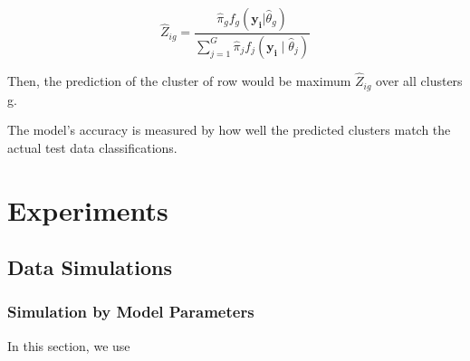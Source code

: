 \documentclass{article}
\begin{document}

\begin{equation}
  \hat{Z}_{ig} = \frac{\hat{\pi}_g f_g(\mathbf{y_i}|\hat{\theta}_g)}{\sum_{j=1}^{G} \hat{\pi}_j f_j(\mathbf{y_i} \mid \hat{\theta}_j)}
\end{equation}

Then, the prediction of the cluster of row would be maximum $\hat{Z}_{ig}$ over all clusters g.

The model's accuracy is measured by how well the predicted clusters match the actual test data classifications.

\section{Experiments}

\subsection{Data Simulations}

\subsubsection{Simulation by Model Parameters}

In this section, we use 
\end{document}
